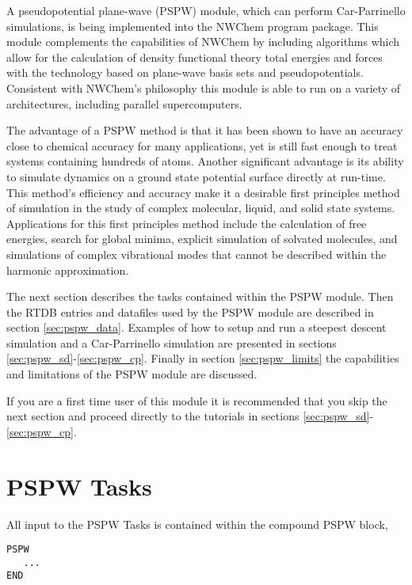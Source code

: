 \label{sec:pspw}

A pseudopotential plane-wave (PSPW) module, which can perform Car-Parrinello
simulations, is being implemented into the NWChem program package.  
This module complements the capabilities of NWChem by including algorithms 
which allow for the calculation of density functional theory total energies 
and forces with the technology based on plane-wave basis sets and 
pseudopotentials.  Consistent with NWChem's philosophy this module is able 
to run on a variety of architectures, including parallel supercomputers.

The advantage of a PSPW method is that it has been shown to have an accuracy 
close to chemical accuracy for many applications, yet is still fast enough 
to treat systems containing hundreds of atoms.  Another significant advantage 
is its ability to simulate dynamics on a ground state potential surface 
directly at run-time.  This method's efficiency and accuracy make it a 
desirable first principles method of simulation in the study of complex 
molecular, liquid, and solid state systems.  Applications for this first 
principles method include the calculation of free energies, search for 
global minima, explicit simulation of solvated molecules, and simulations 
of complex vibrational modes that cannot be described within the harmonic 
approximation.

The next section describes the tasks contained within the PSPW module.
Then the RTDB entries and datafiles used by the PSPW module are described 
in section \ref{sec:pspw_data}.  Examples of how to setup and run
a steepest descent simulation and a Car-Parrinello simulation are presented
in sections \ref{sec:pspw_sd}-\ref{sec:pspw_cp}.  Finally in section
\ref{sec:pspw_limits} the capabilities and limitations of the PSPW
module are discussed.

If you are a first time user of this module it is recommended that you skip
the next section and proceed directly to the tutorials in sections 
\ref{sec:pspw_sd}-\ref{sec:pspw_cp}.

\section{PSPW Tasks}
\label{sec:pspw_tasks}

All input to the PSPW Tasks is contained within the compound PSPW  block,
\begin{verbatim}
PSPW
   ...
END
\end{verbatim}

